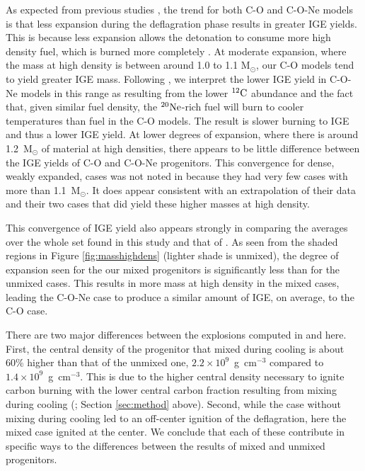 \documentclass[preprint2]{aastex63}
\newcommand{\C}[1]{\ensuremath{{}^{#1}{\rm C}}}
\newcommand{\Ne}[1]{\ensuremath{{}^{#1}{\rm Ne}}}
\begin{document}
As expected from previous studies \citep[e.g.][]{townetal2009}, the trend for both C-O and C-O-Ne
models is that less expansion during the deflagration phase results in
greater IGE yields.
This is because less expansion allows the detonation to consume more high density fuel, which is burned more completely \citep[See discussion in][and references therein]{SeitenzahlTownsley2017}.
At moderate expansion, where the mass at high density is between around 1.0 to 1.1 M$_\odot$, our C-O models tend to yield greater IGE mass.
Following
\citet{willcoxetal2016}, we interpret
the lower IGE yield in C-O-Ne models in this range as resulting
from the lower \C{12} abundance and the fact that, given
similar fuel density, the \Ne{20}-rich fuel will burn to cooler
temperatures than fuel in the C-O models. The result is
slower burning to IGE and thus a lower IGE yield.
At lower degrees of expansion, where there is around 1.2~M$_\odot$ of material at high densities, there appears to be little difference between the IGE yields of C-O and C-O-Ne progenitors.
This convergence for dense, weakly expanded, cases was not noted in \citet{willcoxetal2016} because they had very few cases with more than 1.1~M$_\odot$.
It does appear consistent with an extrapolation of their data and their two cases that did yield these higher masses at high density.

This convergence of IGE yield also appears strongly in comparing the averages over the whole set found in this study and that of \citet{willcoxetal2016}.
As seen from the shaded regions in Figure \ref{fig:masshighdens} (lighter shade is unmixed), the degree of expansion seen for the our mixed progenitors is significantly less than for the unmixed cases.
This results in more mass at high density in the mixed cases, leading the C-O-Ne case to produce a similar amount of IGE, on average, to the C-O case.

There are two major differences between the explosions computed in \citet{willcoxetal2016} and here.
First, the central density of the progenitor that mixed during cooling is about 60\% higher than that of the unmixed one, $2.2\times10^9$~g~cm$^{-3}$ compared to $1.4\times 10^9$~g~cm$^{-3}$.
This is due to the higher central density necessary to ignite carbon burning with the lower central carbon fraction resulting from mixing during cooling
(\citealt{brooksetal2017}; Section \ref{sec:method} above).
Second, while the case without mixing during cooling led to an off-center ignition of the deflagration, here the mixed case ignited at the center.
We conclude that each of these contribute in specific ways to the differences between the results of mixed and unmixed progenitors.
\end{document}
